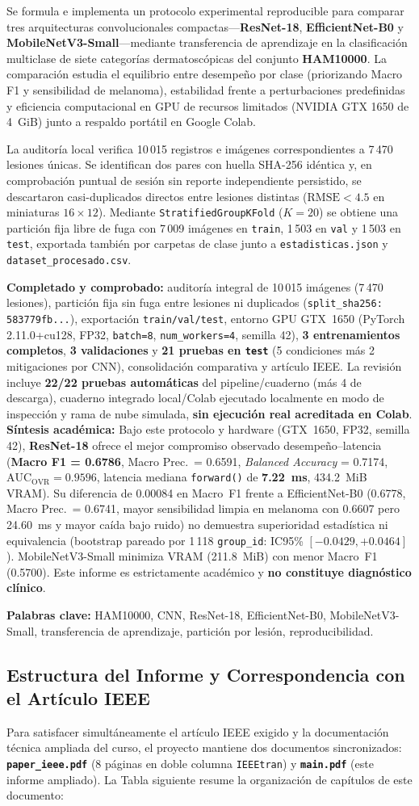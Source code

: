 \documentclass[10pt,a4paper]{article}
\newcommand{\estado}{%
\begin{tcolorbox}[notaBox,title={Estado verificado de la investigación}]
\textbf{Completado y comprobado:} auditoría integral de 10\,015 imágenes (7\,470 lesiones), partición fija sin fuga entre lesiones ni duplicados (\texttt{split\_sha256: 583779fb...}), exportación \texttt{train/val/test}, entorno GPU GTX~1650 (PyTorch 2.11.0+cu128, FP32, \texttt{batch=8}, \texttt{num\_workers=4}, semilla 42), \textbf{3 entrenamientos completos}, \textbf{3 validaciones} y \textbf{21 pruebas en \texttt{test}} (5 condiciones más 2 mitigaciones por CNN), consolidación comparativa y artículo IEEE. La revisión incluye \textbf{22/22 pruebas automáticas} del pipeline/cuaderno (más 4 de descarga), cuaderno integrado local/Colab ejecutado localmente en modo de inspección y rama de nube simulada, \textbf{sin ejecución real acreditada en Colab}.\\[4pt]
\textbf{Síntesis académica:} Bajo este protocolo y hardware (GTX~1650, FP32, semilla 42), \textbf{ResNet-18} ofrece el mejor compromiso observado desempeño--latencia (\textbf{Macro F1 = 0.6786}, Macro Prec.\ = 0.6591, \textit{Balanced Accuracy} = 0.7174, $\mathrm{AUC}_{\mathrm{OVR}}=0.9596$, latencia mediana \texttt{forward()} de \textbf{7.22~ms}, 434.2~MiB VRAM). Su diferencia de 0.00084 en Macro~F1 frente a EfficientNet-B0 (0.6778, Macro Prec.\ = 0.6741, mayor sensibilidad limpia en melanoma con 0.6607 pero 24.60~ms y mayor caída bajo ruido) no demuestra superioridad estadística ni equivalencia (bootstrap pareado por 1\,118 \texttt{group\_id}: IC95\% $[-0.0429, +0.0464]$). MobileNetV3-Small minimiza VRAM (211.8~MiB) con menor Macro~F1 (0.5700). Este informe es estrictamente académico y \textbf{no constituye diagnóstico clínico}.
\end{tcolorbox}}
\begin{document}
Se formula e implementa un protocolo experimental reproducible para comparar tres arquitecturas convolucionales compactas---\textbf{ResNet-18}, \textbf{EfficientNet-B0} y \textbf{MobileNetV3-Small}---mediante transferencia de aprendizaje en la clasificación multiclase de siete categorías dermatoscópicas del conjunto \textbf{HAM10000}. La comparación estudia el equilibrio entre desempeño por clase (priorizando Macro F1 y sensibilidad de melanoma), estabilidad frente a perturbaciones predefinidas y eficiencia computacional en GPU de recursos limitados (NVIDIA GTX 1650 de 4~GiB) junto a respaldo portátil en Google Colab.

La auditoría local verifica 10\,015 registros e imágenes correspondientes a 7\,470 lesiones únicas. Se identifican dos pares con huella SHA-256 idéntica y, en comprobación puntual de sesión sin reporte independiente persistido, se descartaron casi-duplicados directos entre lesiones distintas ($\mathrm{RMSE}<4.5$ en miniaturas $16\times 12$). Mediante \texttt{StratifiedGroupKFold} ($K=20$) se obtiene una partición fija libre de fuga con 7\,009 imágenes en \texttt{train}, 1\,503 en \texttt{val} y 1\,503 en \texttt{test}, exportada también por carpetas de clase junto a \texttt{estadisticas.json} y \texttt{dataset\_procesado.csv}.

\estado

\noindent\textbf{Palabras clave:} HAM10000, CNN, ResNet-18, EfficientNet-B0, MobileNetV3-Small, transferencia de aprendizaje, partición por lesión, reproducibilidad.

\subsection*{Estructura del Informe y Correspondencia con el Artículo IEEE}
Para satisfacer simultáneamente el artículo IEEE exigido y la documentación técnica ampliada del curso, el proyecto mantiene dos documentos sincronizados: \textbf{\texttt{paper\_ieee.pdf}} (8 páginas en doble columna \texttt{IEEEtran}) y \textbf{\texttt{main.pdf}} (este informe ampliado). La Tabla siguiente resume la organización de capítulos de este documento:
\end{document}
